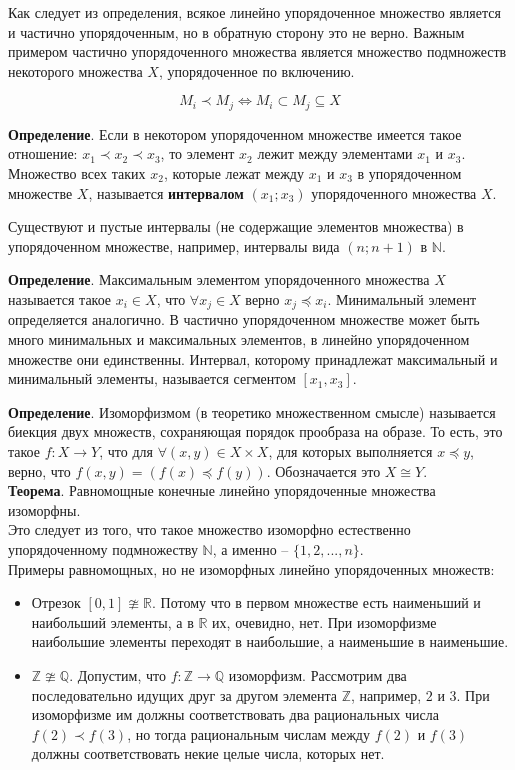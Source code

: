 \documentclass[a4paper]{book}
\begin{document}
Как следует из определения, всякое линейно упорядоченное множество является и частично упорядоченным, но в обратную сторону это не верно. Важным примером частично упорядоченного множества является множество подмножеств некоторого множества $X$, упорядоченное по включению. 

\begin{equation}
M_i \prec M_j\Leftrightarrow M_i\subset M_j \subseteq X
\end{equation}

\textbf{Определение}. Если в некотором упорядоченном множестве имеется такое отношение: $x_1 \prec x_2 \prec x_3$, то элемент $x_2$ лежит между элементами $x_1$ и $x_3$. Множество всех таких $x_2$, которые лежат между $x_1$ и $x_3$ в упорядоченном множестве $X$, называется \textbf{интервалом} $(x_1;x_3)$ упорядоченного множества $X$. 

Существуют и пустые интервалы (не содержащие элементов множества) в упорядоченном множестве, например, интервалы вида $(n;n+1)$ в $\mathbb{N}$.

\textbf{Определение}. Максимальным элементом упорядоченного множества $X$ называется такое $x_i\in X$, что $\forall x_j\in X$ верно $x_j\preceq x_i$. Минимальный элемент определяется аналогично. 
В частично упорядоченном множестве может быть много минимальных и максимальных элементов, в линейно упорядоченном множестве они единственны. 
Интервал, которому принадлежат максимальный и минимальный элементы, называется сегментом $[x_1,x_3]$. 

\textbf{Определение}. Изоморфизмом (в теоретико множественном смысле) называется биекция двух множеств, сохраняющая порядок прообраза на образе. То есть, это такое $f: X\rightarrow Y$, что для $\forall (x,y)\in X\times X$, для которых выполняется $x\preceq y$, верно, что $f(x,y) = (f(x)\preceq f(y))$. Обозначается это $X\cong Y$. 
\\
\textbf{Теорема}. Равномощные конечные линейно упорядоченные множества изоморфны. 
\\
Это следует из того, что такое множество изоморфно естественно упорядоченному подмножеству $\mathbb{N}$, а именно -- $\{1,2,...,n\}$.
\\
Примеры равномощных, но не изоморфных линейно упорядоченных множеств:

\begin{itemize}
	\item Отрезок $[0,1] \ncong \mathbb{R}$. Потому что в первом множестве есть наименьший и наибольший элементы, а в $\mathbb{R}$ их, очевидно, нет. При изоморфизме наибольшие элементы переходят в наибольшие, а наименьшие в наименьшие. 
	\item $\mathbb{Z}\ncong\mathbb{Q}$. Допустим, что $f:\mathbb{Z}\rightarrow\mathbb{Q}$ изоморфизм. Рассмотрим два последовательно идущих друг за другом элемента $\mathbb{Z}$, например, $2$ и $3$. При изоморфизме им должны соответствовать два рациональных числа $f(2)\prec f(3)$, но тогда рациональным числам между $f(2)$ и $f(3)$ должны соответствовать некие целые числа, которых нет. 
\end{itemize}
\end{document}
